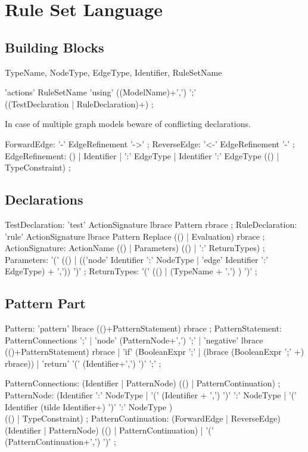 \chapter{Rule Set Language}

\section{Building Blocks}
TypeName, NodeType, EdgeType, Identifier, RuleSetName

\begin{rail}
  'actions' RuleSetName 'using' ((ModelName)+',') ';' \\ ((TestDeclaration | RuleDeclaration)+) ;
\end{rail}
In case of multiple graph models beware of conflicting declarations.

\begin{rail}
  ForwardEdge: '-' EdgeRefinement '->' ;
  ReverseEdge: '<-' EdgeRefinement '-' ;  
  EdgeRefinement: () | Identifier | ':' EdgeType | Identifier ':' EdgeType (() | TypeConstraint) ;
\end{rail}

\section{Declarations}
\begin{rail}
  TestDeclaration: 'test' ActionSignature lbrace Pattern rbrace ;
  RuleDeclaration: 'rule' ActionSignature lbrace Pattern Replace (() | Evaluation) rbrace ;
  ActionSignature: ActionName (() | Parameters) (() | ':' ReturnTypes) ;
  Parameters: '(' (() | (('node' Identifier ':' NodeType | 'edge' Identifier ':' EdgeType) + ',')) ')' ;
  ReturnTypes: '(' (() | (TypeName + ',') ) ')' ;
\end{rail}

\section{Pattern Part}
\begin{rail}
  Pattern: 'pattern' lbrace (()+PatternStatement) rbrace ;
  PatternStatement: PatternConnections ';' |
    'node' (PatternNode+',') ';' |
    'negative' lbrace (()+PatternStatement) rbrace |
    'if' (BooleanExpr ';' | (lbrace (BooleanExpr ';' +) rbrace)) |
    'return' '(' (Identifier+',') ')' ';' ;
\end{rail} 

\begin{rail}   
  PatternConnections: (Identifier | PatternNode) (() | PatternContinuation) ;
  PatternNode: (Identifier ':' NodeType 
    | '(' (Identifier + ',') ')' ':' NodeType
    | '(' Identifier (tilde Identifier+) ')' ':' NodeType ) \\
      (() | TypeConstraint) ; 
  PatternContinuation: (ForwardEdge | ReverseEdge) (Identifier | PatternNode) (() | PatternContinuation) |
    '(' (PatternContinuation+',') ')' ; 
\end{rail}


